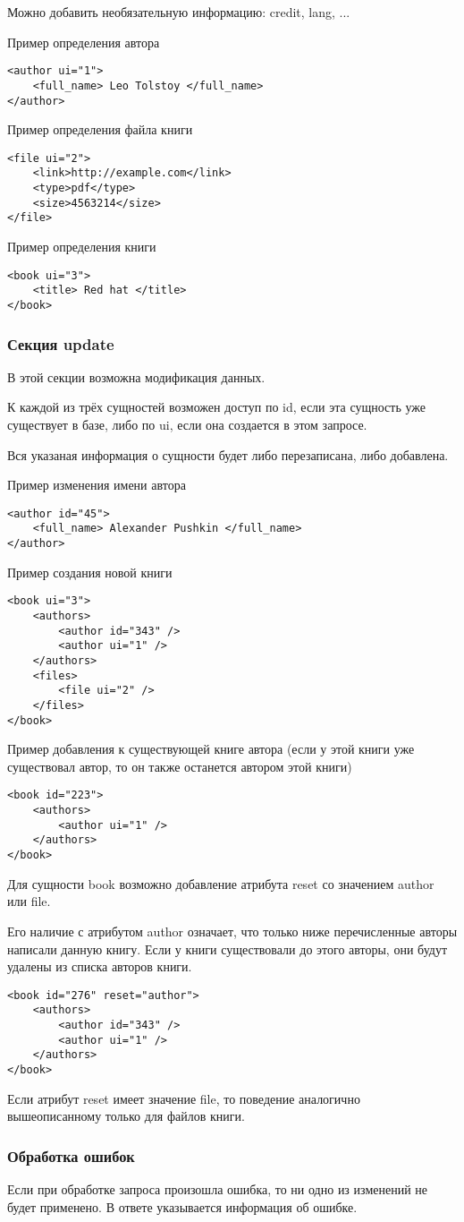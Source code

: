 Можно добавить необязательную информацию: credit, lang, ... 

Пример определения автора 
\begin{verbatim}
<author ui="1">
    <full_name> Leo Tolstoy </full_name>
</author>
\end{verbatim}

Пример определения файла книги 
\begin{verbatim}
<file ui="2">
    <link>http://example.com</link>
    <type>pdf</type>
    <size>4563214</size>
</file>
\end{verbatim}

Пример определения книги 
\begin{verbatim}
<book ui="3">
    <title> Red hat </title>
</book>
\end{verbatim}

\subsubsection{Секция update}

В этой секции возможна модификация данных. 

К каждой из трёх сущностей возможен доступ по id, если эта сущность уже существует в базе, либо по ui, если она создается в этом запросе. 

Вся указаная информация о сущности будет либо перезаписана, либо добавлена. 

Пример изменения имени автора 
\begin{verbatim}
<author id="45">
    <full_name> Alexander Pushkin </full_name>
</author>
\end{verbatim}

Пример создания новой книги 
\begin{verbatim}
<book ui="3">
    <authors>
        <author id="343" />
        <author ui="1" />
    </authors>
    <files>
        <file ui="2" />
    </files>
</book>
\end{verbatim}

Пример добавления к существующей книге автора (если у этой книги уже существовал автор, то он также останется автором этой книги) 
\begin{verbatim}
<book id="223">
    <authors>
        <author ui="1" />
    </authors>
</book>
\end{verbatim}

Для сущности book возможно добавление атрибута reset со значением author или file. 

Его наличие с атрибутом author означает, что только ниже перечисленные авторы написали данную книгу. Если у книги существовали до этого авторы, они будут удалены из списка авторов книги. 
\begin{verbatim}
<book id="276" reset="author">
    <authors>
        <author id="343" />
        <author ui="1" />
    </authors>
</book>
\end{verbatim}

Если атрибут reset имеет значение file, то поведение аналогично вышеописанному только для файлов книги. 

\subsubsection{Обработка ошибок}

Если при обработке запроса произошла ошибка, то ни одно из изменений не будет применено. 
В ответе указывается информация об ошибке.
